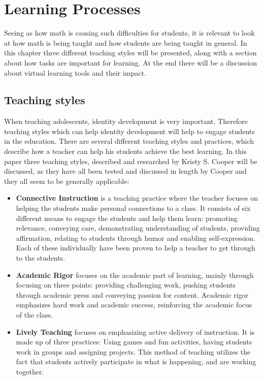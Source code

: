 \section{Learning Processes}
Seeing as how math is causing such difficulties for students, it is relevant to look at how math is being taught and how students are being taught in general. In this chapter three different teaching styles will be presented, along with a section about how tasks are important for learning. At the end there will be a discussion about virtual learning tools and their impact.

\subsection{Teaching styles}
When teaching adolescents, identity development is very important. Therefore teaching styles which can help identity development will help to engage students in the education. There are several different teaching styles and practices, which describe how a teacher can help his students achieve the best learning. In this paper three teaching styles, described and researched by Kristy S. Cooper\cite{CooperElicitingPractices} will be discussed, as they have all been tested and discussed in length by Cooper and they all seem to be generally applicable:

\begin{itemize}
\item \textbf{Connective Instruction} is a teaching practice where the teacher focuses on helping the students make personal connections to a class. It consists of six different means to engage the students and help them learn: promoting relevance, conveying care, demonstrating understanding of students, providing affirmation, relating to students through humor and enabling self-expression. Each of these individually have been proven to help a teacher to get through to the students.
\item \textbf{Academic Rigor} focuses on the academic part of learning, mainly through focusing on three points: providing challenging work, pushing students through academic press and conveying passion for content. Academic rigor emphasizes hard work and academic success, reinforcing the academic focus of the class.
\item \textbf{Lively Teaching} focuses on emphasizing active delivery of instruction. It is made up of three practices: Using games and fun activities, having students work in groups and assigning projects. This method of teaching utilizes the fact that students actively participate in what is happening, and are working together.
\end{itemize}

